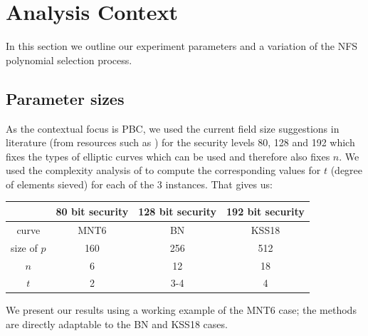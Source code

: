 \documentclass[a4paper, 10pt, envcountsect, runningheads]{article}
\numberwithin{figure}{section}
\numberwithin{equation}{section}
\begin{document}
\section{Analysis Context}
\label{s:context}
In this section we outline our experiment parameters and a variation of the NFS polynomial selection process. 
\subsection*{Parameter sizes}
As the contextual focus is PBC, we used the current field size suggestions in literature (from resources such as \cite{lenstra-verheul,lenstra01,ECRYPT_key_sizes}) for the security levels 80, 128 and 192 which fixes the types of elliptic curves which can be used and therefore also fixes $n$. We used the complexity analysis of \cite{joux-lercier-smart-vercauteren06} to compute the corresponding values for $t$ (degree of elements sieved) for each of the 3 instances. That gives us:
\begin{center}
\begin{tabular}{|c|c|c|c|}
\hline
&80 bit security & 128 bit security & 192 bit security\\
\hline
curve & MNT6 & BN & KSS18\\
size of $p$ & 160 & 256 & 512\\
$n$ & 6 & 12 & 18\\
$t$ & 2 & 3-4 & 4\\
\hline
\end{tabular}
\end{center}
We present our results using a working example of the MNT6 case; the methods are directly adaptable to the BN and KSS18 cases. 
\end{document}
